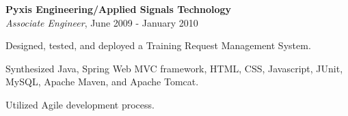 
\atab \textbf{Pyxis Engineering/Applied Signals Technology}\\
\btab \textit{Associate Engineer}, June 2009 - January 2010\\
\begin{my_list}
\item Designed, tested, and deployed a Training Request Management System.
\item Synthesized Java, Spring Web MVC framework, HTML, CSS, Javascript, JUnit,\\ \tab \tab MySQL, Apache Maven, and Apache Tomcat.
\item Utilized Agile development process.
\end{my_list}
\medskip

